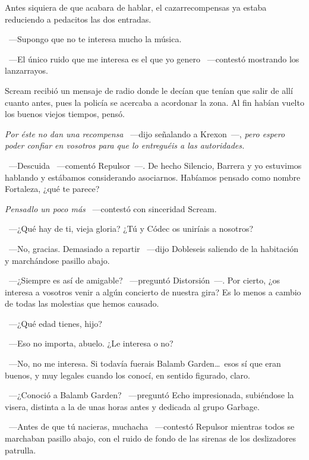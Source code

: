 Antes siquiera de que acabara de hablar, el cazarrecompensas ya estaba reduciendo a pedacitos las dos entradas.

~---Supongo que no te interesa mucho la música.

~---El único ruido que me interesa es el que yo genero ~---contestó mostrando los lanzarrayos.

Scream recibió un mensaje de radio donde le decían que tenían que salir de allí cuanto antes, pues la policía se acercaba a acordonar la zona. Al fin habían vuelto los buenos viejos tiempos, pensó.

\emph{Por éste no dan una recompensa} ~---dijo señalando a Krexon~---, \emph{pero espero poder confiar en vosotros para que lo entreguéis a las autoridades.}

~---Descuida ~---comentó Repulsor~---. De hecho Silencio, Barrera y yo estuvimos hablando y estábamos considerando asociarnos. Habíamos pensado como nombre Fortaleza, ¿qué te parece?

\emph{Pensadlo un poco más} ~---contestó con sinceridad Scream.

~---¿Qué hay de ti, vieja gloria? ¿Tú y Códec os uniríais a nosotros?

~---No, gracias. Demasiado a repartir ~---dijo Dobleseis saliendo de la habitación y marchándose pasillo abajo.

~---¿Siempre es así de amigable? ~---preguntó Distorsión~---. Por cierto, ¿os interesa a vosotros venir a algún concierto de nuestra gira? Es lo menos a cambio de todas las molestias que hemos causado.

~---¿Qué edad tienes, hijo?

~---Eso no importa, abuelo. ¿Le interesa o no?

~---No, no me interesa. Si todavía fuerais Balamb Garden\dots\ esos sí que eran buenos, y muy legales cuando los conocí, en sentido figurado, claro.

~---¿Conoció a Balamb Garden? ~---preguntó Echo impresionada, subiéndose la visera, distinta a la de unas horas antes y dedicada al grupo Garbage.

~---Antes de que tú nacieras, muchacha ~---contestó Repulsor mientras todos se marchaban pasillo abajo, con el ruido de fondo de las sirenas de los deslizadores patrulla.

